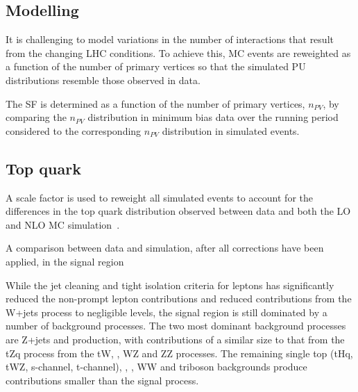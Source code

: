 \subsection{\PU Modelling}\label{subsec:puSF}
It is challenging to model variations in the number of \PU interactions that result from the changing LHC conditions.
To achieve this, MC events are reweighted as a function of the number of primary vertices so that the simulated PU distributions resemble those observed in data.

The \PU SF is determined as a function of the number of primary vertices, $n_{PV}$, by comparing the $n_{PV}$ distribution in minimum bias data over the running period considered to the corresponding $n_{PV}$ distribution in simulated events.

\subsection{Top quark \pt}
A scale factor is used to reweight all simulated \ttbar events to account for the differences in the top quark \pt distribution observed between data and both the LO and NLO MC simulation~\cite{Khachatryan:2015oqa}.

A comparison between data and simulation, after all corrections have been applied, in the signal region 

While the jet cleaning and tight isolation criteria for leptons has significantly reduced the non-prompt lepton contributions and reduced contributions from the W+jets process to negligible levels, the signal region is still dominated by a number of background processes.
The two most dominant background processes are Z+jets and \ttbar production, with contributions of a similar size to that from the tZq process from the tW, \ttbarZ, WZ and ZZ processes.
The remaining single top (tHq, tWZ, s-channel, t-channel), \ttbarW, \ttbarH, WW and triboson backgrounds produce contributions smaller than the signal process.

